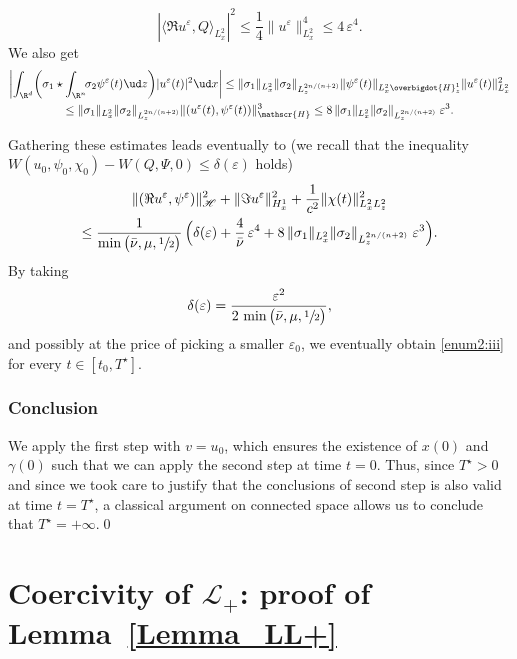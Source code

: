 \[
\left|\langle \Re u^{\varepsilon},Q\rangle_{L_{x}^{2}}\right|^{2}\leq\frac{1}{4}\|u^{\varepsilon}\|_{L_{x}^{2}}^{4}\leq 4\,\varepsilon^{4}.
\]
We also get
\bgroup
{}
\begin{multline*}
\left|\int_{\R^{d}}\biggl(\sigma_{1}\star\int_{\R^{n}}\!\!\sigma_{2}\psi^{\varepsilon}(t)\ud z\biggr)|u^{\varepsilon}(t)|^{2}\ud x\right|\leq\|\sigma_{1}\|_{L_{x}^{2}}\|\sigma_{2}\|_{L_{z}^{2n/(n+2)}}\|\psi^{\varepsilon}(t)\|_{L_{x}^{2}\overbigdot{H}_{z}^{1}}\|u^{\varepsilon}(t)\|_{L_{x}^{2}}^{2}\\
\leq\|\sigma_{1}\|_{L_{x}^{2}}\|\sigma_{2}\|_{L_{z}^{2n/(n+2)}}\|(u^{\varepsilon}(t),\psi^{\varepsilon}(t))\|_{\mathscr{H}}^{3}\leq 8\,\|\sigma_{1}\|_{L_{x}^{2}}\|\sigma_{2}\|_{L_{z}^{2n/(n+2)}}\;\varepsilon^{3}.
\end{multline*}
\egroup

Gathering these estimates leads eventually to (we recall that the inequality $W(u_{0},\psi_{0},\chi_{0})-W(Q,\Psi,0)\leq\delta(\varepsilon)$ holds)
\begin{multline*}
\|(\Re u^{\varepsilon},\psi^{\varepsilon})\|_{\mathscr{H}}^{2}+\|\Im u^{\varepsilon}\|_{H_{x}^{1}}^{2}+\frac{1}{c^{2}}\|\chi(t)\|_{L_{x}^{2}L_{z}^{2}}^{2}\\
\leq\frac{1}{\min\big(\bar{\nu},\mu,\sfrac{1}{2}\big)}\,\Bigl(\delta(\varepsilon)+\frac{4}{\bar{\nu}}\,\varepsilon^{4}+8\,\|\sigma_{1}\|_{L_{x}^{2}}\|\sigma_{2}\|_{L_{z}^{2n/(n+2)}}\;\varepsilon^{3}\Bigr).
\end{multline*}
By taking
\[
\delta(\varepsilon)=\frac{\varepsilon^{2}}{2\,\min\big(\bar{\nu},\mu,\sfrac{1}{2}\big)},
\]
and possibly at the price of picking a smaller $\varepsilon_{0}$, we eventually obtain \eqref{enum2:iii} for every $t\in[t_{0},T^{\star}]$.

\subsubsection*{Conclusion} We apply the first step with $v=u_{0}$, which ensures the existence of $x(0)$ and $\gamma(0)$ such that we can apply the second step at time $t=0$. Thus, since $T^{\star}>0$ and since we took care to justify that the conclusions of second step is also valid at time $t=T^{\star}$, a classical argument on connected space allows us to conclude that $T^{\star}=+\infty$.\qed

\section{Coercivity of \texorpdfstring{$\mathcal{L}_{+}$}{L}: proof of Lemma~\ref{Lemma_LL+}}\label{Proof_Lemma_LL+}

